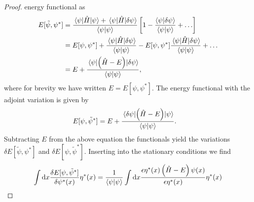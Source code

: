 \begin{proof}
            energy functional as
            \begin{align}
                E[\tilde{\psi}, \psi^{*}]
                &= \frac{
                    \mel{\psi}{\hamil}{\psi}
                    + \mel{\psi}{\hamil}{\delta\psi}
                }{
                    \braket{\psi}
                }\brak{
                    1 - \frac{\braket{\psi}{\delta\psi}}{\braket{\psi}}
                    + \dots
                }
                \\
                &=
                E[\psi, \psi^{*}]
                + \frac{
                    \mel{\psi}{\hamil}{\delta\psi}
                }{
                    \braket{\psi}
                }
                - E[\psi, \psi^{*}]
                \frac{
                    \mel{\psi}{\hamil}{\delta\psi}
                }{
                    \braket{\psi}
                }
                + \dots
                \\
                &=
                E + \frac{
                    \mel{\psi}{\para{\hamil - E}}{\delta\psi}
                }{
                    \braket{\psi}
                },
            \end{align}
            where for brevity we have written $E = E[\psi, \psi^{*}]$.
            The energy functional with the adjoint variation is given by
            \begin{align}
                E[\psi, \tilde{\psi}^{*}]
                &=
                E + \frac{
                    \mel{\delta\psi}{\left( \hat{H}- E \right)}{\psi}
                }{
                    \braket{\psi}
                }.
            \end{align}
            Subtracting $E$ from the above equation the functionals yield the
            variations $\delta E[\tilde{\psi}, \psi^{*}]$ and $\delta E[\psi,
            \tilde{\psi}^{*}]$.
            Inserting into the stationary conditions we find
            \begin{align}
                \int\dd x
                \frac{
                    \delta E[\psi, \tilde{\psi}^{*}]
                }{
                    \delta\psi^{*}(x)
                }\eta^{*}(x)
                &=
                \frac{1}{\braket{\psi}}
                \int\dd x
                \frac{
                    \epsilon\eta^{*}(x)\para{
                        \hamil
                        - E
                    }
                    \psi(x)
                }{
                    \epsilon\eta^{*}(x)
                }
                \eta^{*}(x)
                \\

\end{align}
\end{proof}
